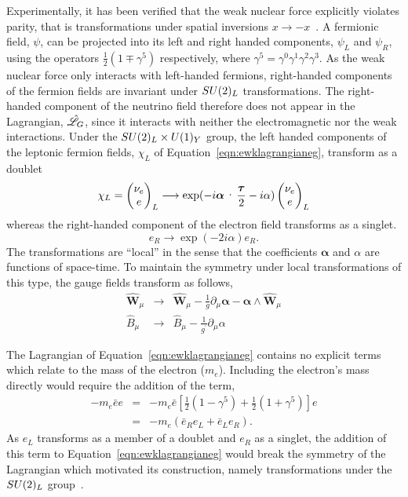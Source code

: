 Experimentally, it has been verified that the weak nuclear force explicitly violates
parity, that is transformations under spatial inversions $x\rightarrow -x$~\citep{wu}.
A fermionic field, $\psi$, can be projected into its left and right handed components, 
$\psi_{L}$ and $\psi_{R}$, using the operators $\frac{1}{2}(1\mp\gamma^{5})$ respectively, 
where $\gamma^{5} = \gamma^{0}\gamma^{1}\gamma^{2}\gamma^{3}$. 
As the weak nuclear force only interacts with left-handed fermions, 
right-handed components of the fermion fields are invariant under $SU(2)_{L}$ transformations.
The right-handed component of the neutrino field therefore does not appear 
in the Lagrangian, $\hat{\mathscr{L}}_{G}$, since it interacts with neither the electromagnetic nor the weak interactions.
Under the $SU(2)_{L}\times U(1)_{Y}$ group, 
the left handed components of the leptonic fermion fields,
$\chi_{L}$ of Equation~\ref{eqn:ewklagrangianeg}, transform as a doublet
\begin{equation}
\chi_{L}  =   
\everymath{\displaystyle} \begin{pmatrix}
\nu_{e} \\ 
e
\end{pmatrix}_{L}
 \longrightarrow 
\exp(-i\boldsymbol\alpha\cdot\frac{\boldsymbol\tau}{2} - i\alpha) 
\begin{pmatrix}
\nu_{e} \\ 
e
\end{pmatrix}_{L}
\end{equation}
\label{eqn:doublettrans}
whereas the right-handed component of the electron field transforms as a singlet.  
\begin{equation}
e_{R}
 \longrightarrow 
\exp(-2i{\alpha}) 
e_{R}.
\end{equation}
The transformations are ``local'' in the sense that the coefficients  
$\boldsymbol{\alpha}$ and $\alpha$ are functions of space-time. 
To maintain the symmetry under local transformations of this type, the gauge fields
transform as follows, 
\begin{eqnarray}
\hat{\mathbf{W}}_{\mu} & 
 \longrightarrow & 
\hat{\mathbf{W}}_{\mu} - \frac{1}{g}\partial_{\mu}\boldsymbol{\alpha} 
	- \boldsymbol{\alpha}\wedge\hat{\mathbf{W}}_{\mu} \\
\hat{{B}}_{\mu} & 
 \longrightarrow & 
\hat{{B}}_{\mu} - \frac{1}{g^{\prime}}\partial_{\mu}{\alpha} 
\end{eqnarray}

The Lagrangian of Equation~\ref{eqn:ewklagrangianeg} contains no explicit terms which 
relate to the mass of the electron ($m_{e}$). Including the electron's mass directly would 
require the addition of the term,
\begin{eqnarray}
-m_{e}\bar{e}e  &=& -m_{e}\bar{e}\left[\frac{1}{2}\left(1-\gamma^{5}\right) 
		    + \frac{1}{2}\left(1+\gamma^{5}\right)\right]e \nonumber \\
		&=& -m_{e}\left(\bar{e}_{R}e_{L} + \bar{e}_{L}e_{R}\right).
\end{eqnarray}
As $e_{L}$ transforms as a member of a doublet and $e_{R}$ as a singlet, 
the addition of this term to Equation~\ref{eqn:ewklagrangianeg} 
would break the symmetry of the Lagrangian which motivated its construction, 
namely transformations under the $SU(2)_{L}$ group~\citep{aitchison}.

